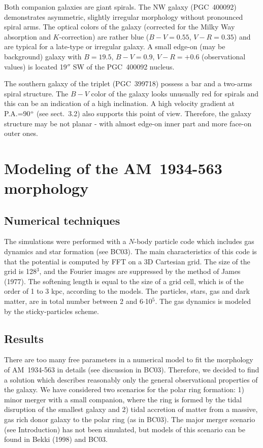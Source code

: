 \documentclass[]{aa}
\begin{document}
Both companion galaxies are giant spirals. The NW galaxy (PGC~400092)
demonstrates asymmetric, slightly irregular morphology without
pronounced spiral arms. The optical colors of the galaxy (corrected
for the Milky Way absorption and $K$-correction) are rather
blue ($B-V=0.55$, $V-R=0.35$) and are typical for a
late-type or irregular galaxy. A small edge-on (may be background) galaxy
with $B=19.5$, $B-V=0.9$, $V-R=+0.6$ (observational values)
is located 19$''$ SW of the PGC~400092 nucleus.

The southern galaxy of the triplet (PGC~399718) possess a bar and 
a two-arms spiral structure. The $B-V$ color of the galaxy
looks unusually red for spirals and this can be an indication of
a high inclination. A high velocity gradient
at P.A.=90$^{\rm o}$ (see sect.~3.2) also supports this point of view. 
Therefore, the galaxy structure may be not planar - with
almost edge-on inner part and more face-on outer ones. 

\section{Modeling of the AM~1934-563 morphology}

\subsection{Numerical techniques}

The simulations were performed with a $N$-body particle
code which includes gas dynamics and star formation (see BC03).  
The main characteristics of this code is that the potential is computed 
by FFT on a 3D Cartesian grid. The size of the grid is 128$^3$, and 
the Fourier images are suppressed by the method of James (1977). 
The softening length is equal to the size of a grid cell, which is 
of the order of 1 to 3 kpc, according to the models. The particles, 
stars, gas and dark matter, are in total number between 2 and 6$\cdot$10$^5$. 
The gas dynamics is modeled by the sticky-particles scheme.

\subsection{Results}

There are too many free parameters in a numerical model
to fit the  morphology of AM~1934-563  in details (see discussion
in BC03). Therefore, we decided to find
a solution which describes reasonably only the general observational  
properties of the galaxy. We have considered two scenarios for
the polar ring formation: 1) minor merger with a small 
companion, where the ring is formed by the tidal disruption of the 
smallest galaxy and 2) tidal accretion of matter from a massive, 
gas rich donor galaxy to the polar ring (as in BC03). The major merger 
scenario (see Introduction) has not been simulated, but models of 
this scenario can be found in Bekki (1998) and BC03.
\end{document}
